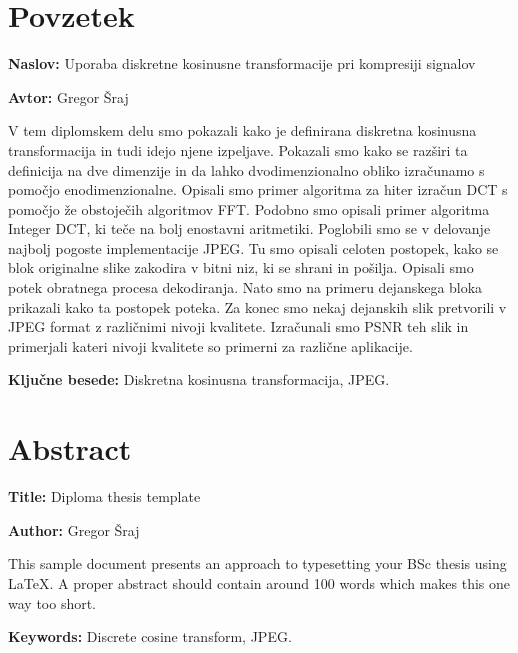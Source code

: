 \documentclass[a4paper,12pt,openright]{book}
\newcommand{\ttitle}{Uporaba diskretne kosinusne transformacije pri kompresiji signalov}
\newcommand{\ttitleEn}{Diploma thesis template}
\newcommand{\tauthor}{Gregor Šraj}
\newcommand{\tkeywords}{Diskretna kosinusna transformacija, JPEG}
\newcommand{\tkeywordsEn}{Discrete cosine transform, JPEG}
\newcommand{\clearemptydoublepage}{\newpage{\pagestyle{empty}\cleardoublepage}}
\begin{document}
\clearemptydoublepage
\chapter*{Povzetek}

\noindent\textbf{Naslov:} \ttitle
\bigskip

\noindent\textbf{Avtor:} \tauthor
\bigskip

\noindent 
V tem diplomskem delu smo pokazali kako je definirana diskretna kosinusna transformacija in tudi idejo njene izpeljave. Pokazali smo kako se razširi ta definicija na dve dimenzije in da lahko dvodimenzionalno obliko izračunamo s pomočjo enodimenzionalne. Opisali smo primer algoritma za hiter izračun DCT s pomočjo že obstoječih algoritmov FFT. Podobno smo opisali primer algoritma Integer DCT, ki teče na bolj enostavni aritmetiki. Poglobili smo se v delovanje najbolj pogoste implementacije JPEG. Tu smo opisali celoten postopek, kako se blok originalne slike zakodira v bitni niz, ki se shrani in pošilja. Opisali smo potek obratnega procesa dekodiranja. Nato smo na primeru dejanskega bloka prikazali kako ta postopek poteka. Za konec smo nekaj dejanskih slik pretvorili v JPEG format z različnimi nivoji kvalitete. Izračunali smo PSNR teh slik in primerjali kateri nivoji kvalitete so primerni za različne aplikacije. 

\bigskip

\noindent\textbf{Ključne besede:} \tkeywords.
\clearemptydoublepage
\chapter*{Abstract}

\noindent\textbf{Title:} \ttitleEn
\bigskip

\noindent\textbf{Author:} \tauthor
\bigskip

\noindent This sample document presents an approach to typesetting your BSc thesis using \LaTeX. 
A proper abstract should contain around 100 words which makes this one way too short.
\bigskip

\noindent\textbf{Keywords:} \tkeywordsEn.
\clearemptydoublepage
\mainmatter
\setcounter{page}{1}
\pagestyle{fancy}
\end{document}

